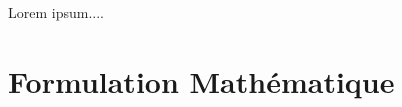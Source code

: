 \documentclass[class=article, crop=false]{standalone}
\begin{document}
    Lorem ipsum....
    \section{Formulation Mathématique}
\end{document}
